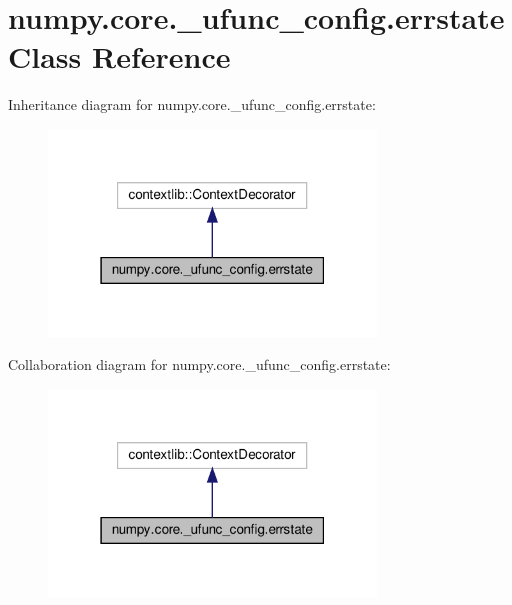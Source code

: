 \hypertarget{classnumpy_1_1core_1_1__ufunc__config_1_1errstate}{}\section{numpy.\+core.\+\_\+ufunc\+\_\+config.\+errstate Class Reference}
\label{classnumpy_1_1core_1_1__ufunc__config_1_1errstate}


Inheritance diagram for numpy.\+core.\+\_\+ufunc\+\_\+config.\+errstate\+:
\nopagebreak
\begin{figure}[H]
\begin{center}
\leavevmode
\includegraphics[width=247pt]{classnumpy_1_1core_1_1__ufunc__config_1_1errstate__inherit__graph}
\end{center}
\end{figure}


Collaboration diagram for numpy.\+core.\+\_\+ufunc\+\_\+config.\+errstate\+:
\nopagebreak
\begin{figure}[H]
\begin{center}
\leavevmode
\includegraphics[width=247pt]{classnumpy_1_1core_1_1__ufunc__config_1_1errstate__coll__graph}
\end{center}
\end{figure}
